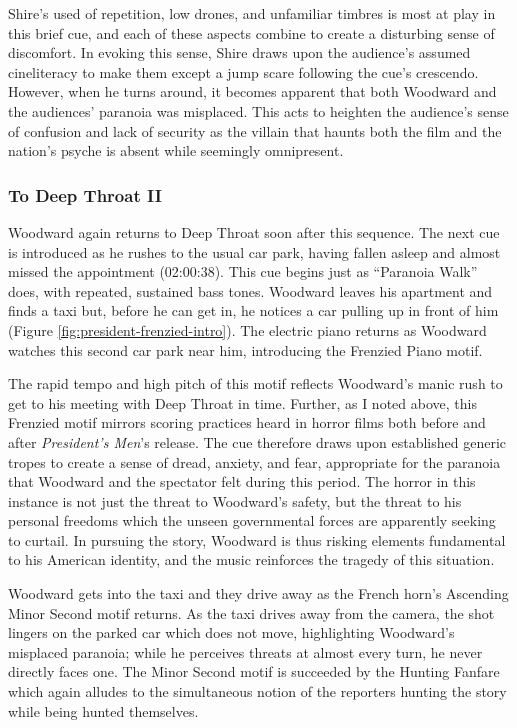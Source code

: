 Shire's used of repetition, low drones, and unfamiliar timbres is most at play in this brief cue, and each of these aspects combine to create a disturbing sense of discomfort. 
In evoking this sense, Shire draws upon the audience’s assumed cineliteracy to make them except a jump scare following the cue’s crescendo.
However, when he turns around, it becomes apparent that both Woodward and the audiences’ paranoia was misplaced.
This acts to heighten the audience's sense of confusion and lack of security as the villain that haunts both the film and the nation's psyche is absent while seemingly omnipresent.




\subsubsection{To Deep Throat II}

Woodward again returns to Deep Throat soon after this sequence.
The next cue is introduced as he rushes to the usual car park, having fallen asleep and almost missed the appointment (02:00:38).
This cue begins just as ``Paranoia Walk” does, with repeated, sustained bass tones.
Woodward leaves his apartment and finds a taxi but, before he can get in, he notices a car pulling up in front of him (Figure \ref{fig:president-frenzied-intro}).
The electric piano returns as Woodward watches this second car park near him, introducing the Frenzied Piano motif.

The rapid tempo and  high pitch of this motif reflects Woodward's manic rush to get to his meeting with Deep Throat in time.
Further, as I noted above, this Frenzied motif mirrors scoring practices heard in horror films both before and after \textit{President's Men}'s release.
The cue therefore draws upon established generic tropes to create a sense of dread, anxiety, and fear, appropriate for the paranoia that Woodward and the spectator felt during this period.
The horror in this instance is not just the threat to Woodward's safety, but the threat to his personal freedoms which the unseen governmental forces are apparently seeking to curtail.
In pursuing the story, Woodward is thus risking elements fundamental to his American identity, and the music reinforces the tragedy of this situation.

Woodward gets into the taxi and they drive away as the French horn's Ascending Minor Second motif returns.
As the taxi drives away from the camera, the shot lingers on the parked car which does not move, highlighting Woodward's misplaced paranoia; while he perceives threats at almost every turn, he never directly faces one.
The Minor Second motif is succeeded by the Hunting Fanfare which again alludes to the simultaneous notion of the reporters hunting the story while being hunted themselves.

